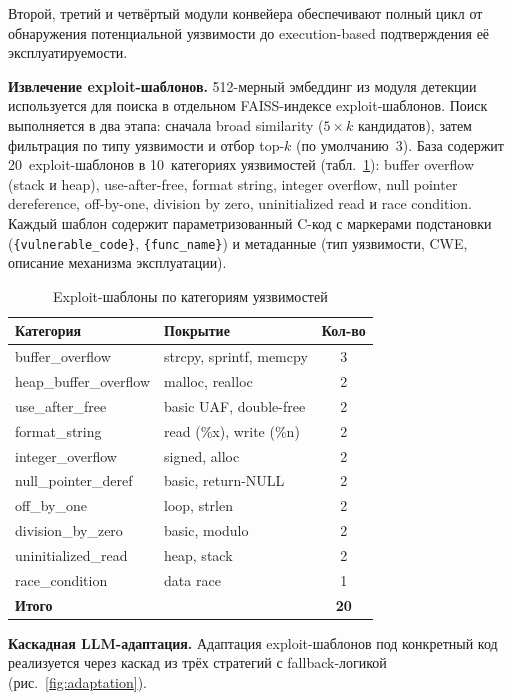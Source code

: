 \documentclass[runningheads]{llncs}
\begin{document}
Второй, третий и четвёртый модули конвейера обеспечивают полный цикл от обнаружения потенциальной уязвимости до execution-based подтверждения её эксплуатируемости.

\textbf{Извлечение exploit-шаблонов.} 512-мерный эмбеддинг из модуля детекции используется для поиска в отдельном FAISS-индексе exploit-шаблонов. Поиск выполняется в два этапа: сначала broad similarity ($5 \times k$ кандидатов), затем фильтрация по типу уязвимости и отбор top-$k$ (по умолчанию~3). База содержит 20~exploit-шаблонов в 10~категориях уязвимостей (табл.~\ref{tab:templates}): buffer overflow (stack и heap), use-after-free, format string, integer overflow, null pointer dereference, off-by-one, division by zero, uninitialized read и race condition. Каждый шаблон содержит параметризованный C-код с маркерами подстановки (\texttt{\{vulnerable\_code\}}, \texttt{\{func\_name\}}) и метаданные (тип уязвимости, CWE, описание механизма эксплуатации).

\begin{table}
\centering
\caption{Exploit-шаблоны по категориям уязвимостей}
\label{tab:templates}
\small
\begin{tabular}{|l|l|c|}
\hline
\textbf{Категория} & \textbf{Покрытие} & \textbf{Кол-во} \\
\hline
buffer\_overflow & strcpy, sprintf, memcpy & 3 \\
heap\_buffer\_overflow & malloc, realloc & 2 \\
use\_after\_free & basic UAF, double-free & 2 \\
format\_string & read (\%x), write (\%n) & 2 \\
integer\_overflow & signed, alloc & 2 \\
null\_pointer\_deref & basic, return-NULL & 2 \\
off\_by\_one & loop, strlen & 2 \\
division\_by\_zero & basic, modulo & 2 \\
uninitialized\_read & heap, stack & 2 \\
race\_condition & data race & 1 \\
\hline
\textbf{Итого} & & \textbf{20} \\
\hline
\end{tabular}
\end{table}

\textbf{Каскадная LLM-адаптация.} Адаптация exploit-шаблонов под конкретный код реализуется через каскад из трёх стратегий с fallback-логикой (рис.~\ref{fig:adaptation}).
\end{document}
